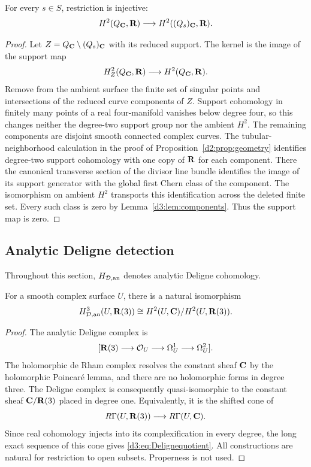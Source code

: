 \begin{lemma}\label{d3:lem:Betti}
For every $s\in S$, restriction is injective:
\[
H^2(Q_{\mathbf C},\mathbf R)\longrightarrow H^2((Q_s)_{\mathbf C},\mathbf R).
\]
\end{lemma}
\begin{proof}
Let $Z=Q_{\mathbf C}\setminus(Q_s)_{\mathbf C}$ with its reduced support. The kernel is the image of the support map
\[
H_Z^2(Q_{\mathbf C},\mathbf R)\longrightarrow H^2(Q_{\mathbf C},\mathbf R).
\]
Remove from the ambient surface the finite set of singular points and intersections of the reduced curve components of $Z$. Support cohomology in finitely many points of a real four-manifold vanishes below degree four, so this changes neither the degree-two support group nor the ambient $H^2$. The remaining components are disjoint smooth connected complex curves.
The tubular-neighborhood calculation in the proof of
Proposition~\ref{d2:prop:geometry} identifies degree-two support
cohomology with one copy of $\mathbf R$ for each component.
There the canonical transverse section of the divisor line bundle
identifies the image of its support generator with the global first
Chern class of the component. The isomorphism on ambient $H^2$
transports this identification across the deleted finite set.
Every such class is zero by Lemma~\ref{d3:lem:components}.
Thus the support map is zero.
\end{proof}

\subsection{Analytic Deligne detection}\label{d3:sec:Delignedetection}

Throughout this section, $H_{\mathcal D,\mathrm{an}}$ denotes analytic Deligne cohomology.

\begin{lemma}\label{d3:lem:Deligne}
For a smooth complex surface $U$, there is a natural isomorphism
\begin{equation}\label{d3:eq:Delignequotient}
H_{\mathcal D,\mathrm{an}}^3(U,\mathbf R(3))
\cong H^2(U,\mathbf C)/H^2(U,\mathbf R(3)).
\end{equation}
\end{lemma}
\begin{proof}
The analytic Deligne complex is
\[
[\mathbf R(3)\longrightarrow\mathcal O_U\longrightarrow\Omega_U^1\longrightarrow\Omega_U^2].
\]
The holomorphic de Rham complex resolves the constant sheaf $\mathbf C$ by the holomorphic Poincar\'e lemma, and there are no holomorphic forms in degree three. The Deligne complex is consequently quasi-isomorphic to the constant sheaf $\mathbf C/\mathbf R(3)$ placed in degree one. Equivalently, it is the shifted cone of
\[
R\Gamma(U,\mathbf R(3))\longrightarrow R\Gamma(U,\mathbf C).
\]
Since real cohomology injects into its complexification in every degree, the long exact sequence of this cone gives \eqref{d3:eq:Delignequotient}. All constructions are natural for restriction to open subsets. Properness is not used.
\end{proof}

